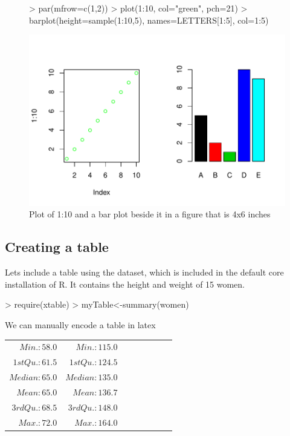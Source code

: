 \documentclass{article}
\begin{document}
\begin{figure}
\begin{Schunk}
\begin{Sinput}
> par(mfrow=c(1,2))
> plot(1:10, col="green", pch=21)
> barplot(height=sample(1:10,5), names=LETTERS[1:5], col=1:5)
\end{Sinput}
\end{Schunk}
\includegraphics{Fig-test3}

\caption{Plot of 1:10 and a bar plot beside it in a figure that is 4x6 inches}

\end{figure}

\newpage
\subsection{Creating a table}

Lets include a table using the dataset,  which is included in the default core installation of R. It contains the height and weight of 15 women.

\begin{Schunk}
\begin{Sinput}
> require(xtable)
> myTable<-summary(women)
\end{Sinput}
\end{Schunk}

We can manually encode a table in latex 


\begin{center}
\begin{tabular}{rrrrrrrr} 

$ Min.   :58.0   $&$ Min.   :115.0   $\\
$ 1st Qu.:61.5   $&$ 1st Qu.:124.5   $\\
$ Median :65.0   $&$ Median :135.0   $\\
$ Mean   :65.0   $&$ Mean   :136.7   $\\
$ 3rd Qu.:68.5   $&$ 3rd Qu.:148.0   $\\
$ Max.   :72.0   $&$ Max.   :164.0   $\\\end{tabular}
\end{center}
\end{document}
